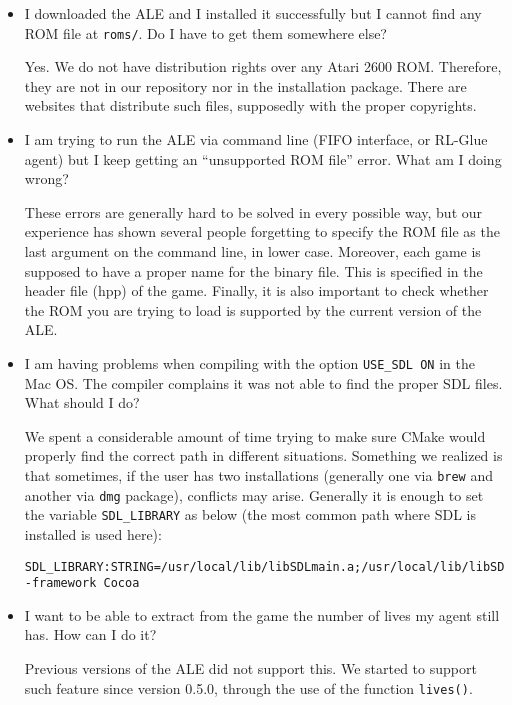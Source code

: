 \documentclass[12pt]{article}
\begin{document}
\begin{itemize}
\item I downloaded the ALE and I installed it successfully but I cannot find any ROM file at \verb+roms/+.
Do I have to get them somewhere else?

Yes. We do not have distribution rights over any Atari 2600 ROM. Therefore, they are not in our 
repository nor in the installation package. There are websites that distribute such files, supposedly
with the proper copyrights.

\item I am trying to run the ALE via command line (FIFO interface, or RL-Glue agent) but I keep 
getting an ``unsupported ROM file'' error. What am I doing wrong?

These errors are generally hard to be solved in every possible way, but our experience has shown 
several people forgetting to specify the ROM file as the last argument on the command line, in lower 
case. Moreover, each game is supposed to have a proper name for the binary file. This is specified 
in the header file (hpp) of the game. Finally, it is also important to check whether the ROM you are 
trying to load is supported by  the current  version of the ALE.

\item I am having problems when compiling with the option \verb+USE_SDL ON+ in the Mac OS.
The compiler complains it was not able to find the proper SDL files. What should I do?

We spent a considerable amount of time trying to make sure CMake would properly find the correct 
path in different situations. Something we realized is that sometimes, if the user has two 
installations (generally one via \verb+brew+ and another via \verb+dmg+ package), conflicts may 
arise. Generally it is enough to set the variable \verb+SDL_LIBRARY+ as below (the most common
path where SDL is installed is used here):
\vspace{-0.3cm}
\begin{verbatim}
SDL_LIBRARY:STRING=/usr/local/lib/libSDLmain.a;/usr/local/lib/libSDL.dylib;
-framework Cocoa
\end{verbatim}

\item I want to be able to extract from the game the number of lives my agent still has. How can I do it?

Previous versions of the ALE did not support this. We started to support such feature since version 
0.5.0, through the use of the function \verb+lives()+.


\end{itemize}
\end{document}
